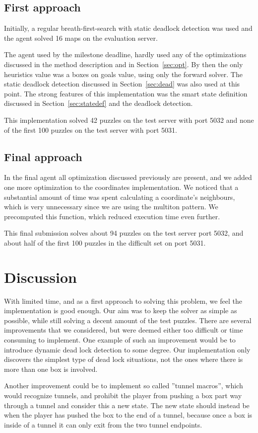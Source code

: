 \documentclass[a4paper,11pt]{article}
\begin{document}
\subsection{First approach}
Initially, a regular breath-first-search with static deadlock detection was used and the agent solved 16 maps on the evaluation server. 

The agent used by the milestone deadline, hardly used any of the optimizations discussed in the method description and in Section~\ref{sec:opt}.
By then the only heuristics value was a boxes on goals value, using only the forward solver. 
The static deadlock detection discussed in Section~\ref{sec:dead} was also used at this point.
The strong features of this implementation was the smart state definition discussed in Section~\ref{sec:statedef} and the deadlock detection. 

This implementation solved 42 puzzles on the test server with port 5032 and none of the first 100 puzzles on the 
test server with port 5031. 

\subsection{Final approach}

In the final agent all optimization discussed previously are present,
and we added one more optimization to the coordinates implementation.
We noticed that a substantial amount of time was spent calculating
a coordinate's neighbours, which is very unnecessary since
we are using the multiton pattern.
We precomputed this function, which reduced execution time even further.

This final submission solves about 94 puzzles on the test server port 5032,
and about half of the first 100 puzzles in the difficult set on port 5031.

\section{Discussion}

With limited time, and as a first approach to solving this problem,
we feel the implementation is good enough.
Our aim was to keep the solver as simple as possible,
while still solving a decent amount of the test puzzles.
There are several improvements that we considered, but were
deemed either too difficult or time consuming to implement.
One example of such an improvement would be to introduce dynamic
dead lock detection to some degree.
Our implementation only discovers the simplest type of dead lock situations,
not the ones where there is more than one box is involved.

Another improvement could be to implement so called ''tunnel macros'',
which would recognize tunnels, and prohibit the player
from pushing a box part way through a tunnel and consider this a new state.
The new state should instead be when the player has pushed the box to the end of a tunnel,
because once a box is inside of a tunnel it can only exit from the two tunnel endpoints.
\end{document}
